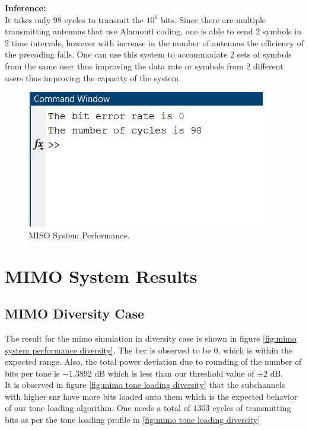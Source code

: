 \textbf{Inference:}\\
It takes only $98$ cycles to transmit the $10^6$ bits. Since there are multiple transmitting antennas that use Alamouti coding, one is able to send 2 symbols in 2 time intervals, however with increase in the number of antennas the efficiency of the precoding falls. One can use this system to accommodate 2 sets of symbols from the same user thus improving the data rate or symbols from 2 different users thus improving the capacity of the system.


\begin{figure}[!htbp]
\centering
\includegraphics[scale=1]{Chapter 4/Figures/MISO System Performance}
\caption{MISO System Performance.}
\label{fig:miso system performance}
\end{figure}

\section{MIMO System Results}

\subsection{MIMO Diversity Case}
The result for the \acrshort{mimo} simulation in diversity case is shown in figure \ref{fig:mimo system performance diversity}. The \acrshort{ber} is observed to be $0$, which is within the expected range. Also, the total power deviation due to rounding of the number of bits per tone is $-1.3892$ dB which is less than our threshold value of $\pm 2$ dB.\\
It is observed in figure \ref{fig:mimo tone loading diversity} that the subchannels with higher \acrshort{snr} have more bits loaded onto them which is the expected behavior of our tone loading algorithm. One needs a total of $1303$ cycles of transmitting bits as per the tone loading profile in \ref{fig:mimo tone loading diversity}\\


